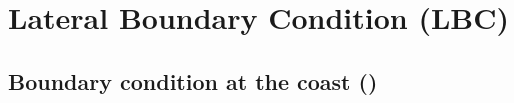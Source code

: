 \documentclass[../main/NEMO_manual]{subfiles}
\begin{document}
\chapter{Lateral Boundary Condition (LBC)}
\label{chap:LBC}

\minitoc

\newpage


\section{Boundary condition at the coast (\protect{})}
\label{sec:LBC_coast}



\end{document}
